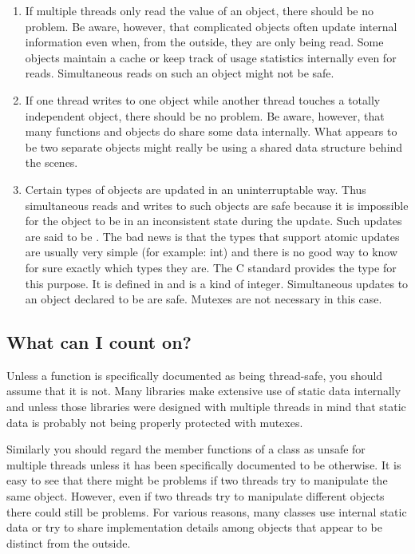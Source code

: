 \begin{enumerate}

\item If multiple threads only read the value of an object, there should be no problem. Be
  aware, however, that complicated objects often update internal information even when, from the
  outside, they are only being read. Some objects maintain a cache or keep track of usage
  statistics internally even for reads. Simultaneous reads on such an object might not be safe.

\item If one thread writes to one object while another thread touches a totally independent
  object, there should be no problem. Be aware, however, that many functions and objects do
  share some data internally. What appears to be two separate objects might really be using a
  shared data structure behind the scenes.

\item Certain types of objects are updated in an uninterruptable way. Thus simultaneous reads
  and writes to such objects are safe because it is impossible for the object to be in an
  inconsistent state during the update. Such updates are said to be . The bad
  news is that the types that support atomic updates are usually very simple (for example: int)
  and there is no good way to know for sure exactly which types they are. The C standard
  provides the type  for this purpose. It is defined in
   and is a kind of integer. Simultaneous updates to an object declared to
  be  are safe. Mutexes are not necessary in this case.

\end{enumerate}

\subsection{What can I count on?}

Unless a function is specifically documented as being thread-safe, you should assume that it is
not. Many libraries make extensive use of static data internally and unless those libraries were
designed with multiple threads in mind that static data is probably not being properly protected
with mutexes.

Similarly you should regard the member functions of a class as unsafe for multiple threads
unless it has been specifically documented to be otherwise. It is easy to see that there might
be problems if two threads try to manipulate the same object. However, even if two threads try
to manipulate different objects there could still be problems. For various reasons, many classes
use internal static data or try to share implementation details among objects that appear to be
distinct from the outside.

